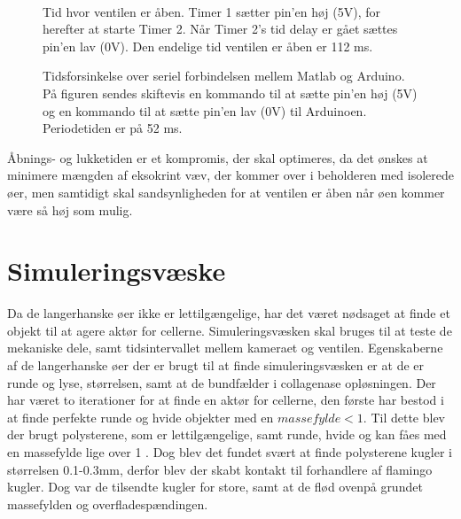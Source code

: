 \begin{figure}[H]
\begin{minipage}[b]{0.48\textwidth}
\end{minipage} \\ %
\begin{minipage}[t]{0.48\textwidth}
\caption{Tid hvor ventilen er åben. Timer 1 sætter pin'en høj (5V), for herefter at starte Timer 2. Når Timer 2's tid delay er gået sættes pin'en lav (0V). Den endelige tid ventilen er åben er 112 ms.} %
\label{fig:timerdelay}
\end{minipage} \hfill
\begin{minipage}[t]{0.48\textwidth}
\caption{Tidsforsinkelse over seriel forbindelsen mellem Matlab og Arduino. På figuren sendes skiftevis en kommando til at sætte pin'en høj (5V) og en kommando til at sætte pin'en lav (0V) til Arduinoen. Periodetiden er på 52 ms.} %
\label{fig:serielconn}
\end{minipage}
\end{figure}

 
Åbnings- og lukketiden er et kompromis, der skal optimeres, da det ønskes at minimere mængden af eksokrint væv, der kommer over i beholderen med isolerede øer, men samtidigt skal sandsynligheden for at ventilen er åben når øen kommer være så høj som mulig.



\section{Simuleringsvæske}
\label{sec:simuleringsv}
Da de langerhanske øer ikke er lettilgængelige, har det været nødsaget at finde et objekt til at agere aktør for cellerne. Simuleringsvæsken skal bruges til at teste de mekaniske dele, samt tidsintervallet mellem kameraet og ventilen. Egenskaberne af de langerhanske øer der er brugt til at finde simuleringsvæsken er at de er runde og lyse, størrelsen, samt at de bundfælder i collagenase opløsningen. Der har været to iterationer for at finde en aktør for cellerne, den første har bestod i at finde perfekte runde og hvide objekter med en $massefylde<1$. Til dette blev der brugt polysterene, som er lettilgængelige, samt runde, hvide og kan fåes med en massefylde lige over 1 \citep{polybog}. Dog blev det fundet svært at finde polysterene kugler i størrelsen 0.1-0.3mm, derfor blev der skabt kontakt til forhandlere af flamingo kugler. Dog var de tilsendte kugler for store, samt at de flød ovenpå grundet massefylden og overfladespændingen. 


